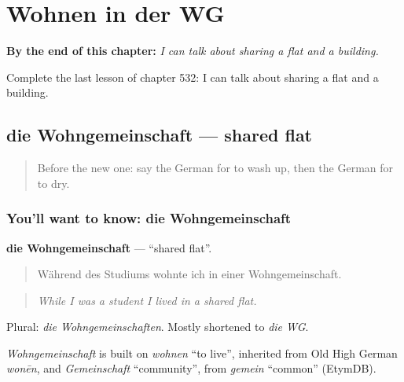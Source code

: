 
\chapter{Wohnen in der WG}
\label{ch:ge-wohnen-in-der-wg}

\begin{chapteropening}
\textbf{By the end of this chapter:} \emph{I can talk about sharing a flat and a building.}

Complete the last lesson of chapter 532: I can talk about sharing a flat and a building.
\end{chapteropening}

\section[die Wohngemeinschaft]{die Wohngemeinschaft — shared flat}

\label{lesson:GE-C532-wohngemeinschaft}



\begin{quote}
Before the new one: say the German for to wash up, then the German for to dry.
\end{quote}

\subsection*{You'll want to know: die Wohngemeinschaft}
\textbf{die Wohngemeinschaft} — \textquotedblleft{}shared flat\textquotedblright{}.

\begin{quote}
Während des Studiums wohnte ich in einer Wohngemeinschaft.
\end{quote}

\begin{quote}
\emph{While I was a student I lived in a shared flat.}
\end{quote}

Plural: \emph{die Wohngemeinschaften}. Mostly shortened to \emph{die WG}.

\begin{cousinweb}
\emph{Wohngemeinschaft} is built on \emph{wohnen} \textquotedblleft{}to live\textquotedblright{}, inherited from Old High German \emph{wonēn}, and \emph{Gemeinschaft} \textquotedblleft{}community\textquotedblright{}, from \emph{gemein} \textquotedblleft{}common\textquotedblright{} (EtymDB).
\end{cousinweb}

